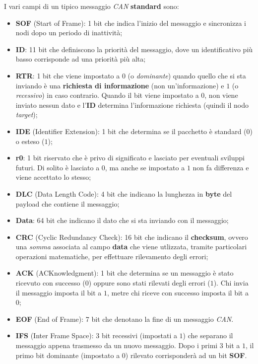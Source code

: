 I vari campi di un tipico messaggio \emph{CAN} \textbf{standard} sono:
\begin{itemize}
    \item \textbf{SOF} (Start of Frame): 1 bit che indica l'inizio del messaggio e sincronizza i nodi dopo un periodo di inattività;
    \item \textbf{ID}: 11 bit che definiscono la priorità del messaggio, dove un identificativo più basso corrisponde ad una priorità più alta;
    \item \textbf{RTR}: 1 bit che viene impostato a $0$ (o \emph{dominante}) quando quello che si sta inviando è una \textbf{richiesta di informazione} (non un'informazione) e $1$ (o \emph{recessivo}) in caso contrario. Quando il bit viene impostato a $0$, non viene inviato nessun dato e l'\textbf{ID} determina l'informazione richiesta (quindi il nodo \emph{target});
    \item \textbf{IDE} (Identifier Extension): 1 bit che determina se il pacchetto è standard ($0$) o esteso ($1$);
    \item \textbf{r0}: 1 bit riservato che è privo di significato e lasciato per eventuali sviluppi futuri. Di solito è lasciato a $0$, ma anche se impostato a $1$ non fa differenza e viene accettato lo stesso;
    \item \textbf{DLC} (Data Length Code): 4 bit che indicano la lunghezza in \textbf{byte} del payload che contiene il messaggio;
    \item \textbf{Data}: 64 bit che indicano il dato che si sta inviando con il messaggio;
    \item \textbf{CRC} (Cyclic Redundancy Check): 16 bit che indicano il \textbf{checksum}, ovvero una \emph{somma} associata al campo \textbf{data} che viene utlizzata, tramite particolari operazioni matematiche, per effettuare rilevamento degli errori;
    \item \textbf{ACK} (ACKnowledgment): 1 bit che determina se un messaggio è stato ricevuto con successo ($0$) oppure sono stati rilevati degli errori ($1$). Chi invia il messaggio imposta il bit a $1$, metre chi riceve con successo imposta il bit a $0$;
    \item \textbf{EOF} (End of Frame): 7 bit che denotano la fine di un messaggio \emph{CAN}.
    \item \textbf{IFS} (Inter Frame Space): 3 bit recessivi (impostati a $1$) che separano il messaggio appena trasmesso da un nuovo messaggio. Dopo i primi 3 bit a $1$, il primo bit dominante (impostato a $0$) rilevato corrisponderà ad un bit \textbf{SOF}. \cite{can_bus_dewesoft} \cite{wikipedia_canbus}
\end{itemize}

